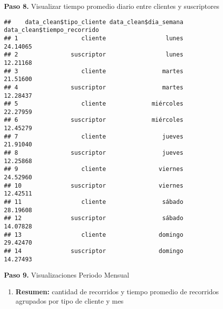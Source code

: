\documentclass[
]{article}
\newenvironment{Shaded}{\begin{snugshade}}{\end{snugshade}}
\newcommand{\AttributeTok}[1]{\textcolor[rgb]{0.13,0.29,0.53}{#1}}
\newcommand{\CommentTok}[1]{\textcolor[rgb]{0.56,0.35,0.01}{\textit{#1}}}
\newcommand{\FunctionTok}[1]{\textcolor[rgb]{0.13,0.29,0.53}{\textbf{#1}}}
\newcommand{\NormalTok}[1]{#1}
\newcommand{\SpecialCharTok}[1]{\textcolor[rgb]{0.81,0.36,0.00}{\textbf{#1}}}
\providecommand{\tightlist}{%
  \setlength{\itemsep}{0pt}\setlength{\parskip}{0pt}}
\begin{document}
\hfill\break
\textbf{Paso 8.} Visualizar tiempo promedio diario entre clientes y
suscriptores

\begin{Shaded}
\end{Shaded}

\begin{verbatim}
##    data_clean$tipo_cliente data_clean$dia_semana data_clean$tiempo_recorrido
## 1                  cliente                 lunes                    24.14065
## 2               suscriptor                 lunes                    12.21168
## 3                  cliente                martes                    21.51600
## 4               suscriptor                martes                    12.28437
## 5                  cliente             miércoles                    22.27959
## 6               suscriptor             miércoles                    12.45279
## 7                  cliente                jueves                    21.91040
## 8               suscriptor                jueves                    12.25868
## 9                  cliente               viernes                    24.52960
## 10              suscriptor               viernes                    12.42511
## 11                 cliente                sábado                    28.19608
## 12              suscriptor                sábado                    14.07828
## 13                 cliente               domingo                    29.42470
## 14              suscriptor               domingo                    14.27493
\end{verbatim}

\hfill\break
\textbf{Paso 9.} Visualizaciones Periodo Mensual

\begin{enumerate}
\def\labelenumi{\arabic{enumi}.}
\tightlist
\item
  \textbf{Resumen:} cantidad de recorridos y tiempo promedio de
  recorridos agrupados por tipo de cliente y mes
\end{enumerate}

\begin{Shaded}
\end{Shaded}
\end{document}
